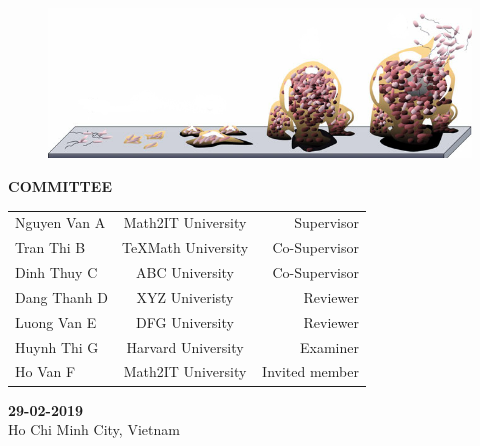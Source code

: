 \documentclass[12pt,a4paper]{article}
\begin{document}
\begin{titlepage}


\begin{center}
  \begin{figure}[h]
  \begin{center}
  \includegraphics[width=0.8\linewidth]{biofilm}
  \end{center}
  \end{figure}
\end{center}
%

\begin{center}
\normalsize\sffamily
\textbf{COMMITTEE}
\end{center}

\vspace{-0.2cm}

\begin{table}[hb!]
\sffamily
\centering
\begin{tabular}{lcr}
Nguyen Van A & Math2IT University & Supervisor \\
Tran Thi B & \TeX Math University & Co-Supervisor \\
Dinh Thuy C & ABC University & Co-Supervisor \\
Dang Thanh D & XYZ Univeristy & Reviewer \\
Luong Van E & DFG University & Reviewer \\
Huynh Thi G & Harvard University & Examiner \\
Ho Van F & Math2IT University & Invited member
\end{tabular}
\end{table}


\begin{center}
\sffamily
\textbf{29-02-2019} \\
Ho Chi Minh City, Vietnam
\end{center}


\end{titlepage}
\end{document}
